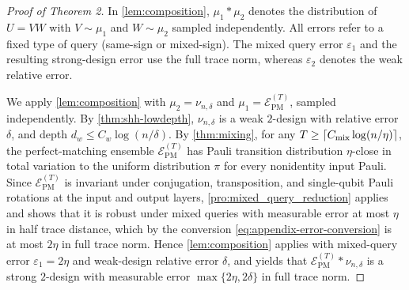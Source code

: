\documentclass[
    aps,
    superscriptaddress,
    onecolumn,
    10pt,
    prx,
    nofootinbib
]{revtex4-2}
\newcommand{\PM}{\mathrm{PM}}
\newcommand{\cE}{\mathcal E}
\theoremstyle{namedstatement}
\theoremstyle{plain}
\begin{document}
\begin{proof}[Proof of Theorem 2]
 In \cref{lem:composition}, $\mu_{1}*\mu_{2}$ denotes the distribution of $U=VW$ with
$V\sim\mu_{1}$ and $W\sim\mu_{2}$ sampled independently. All errors refer to a fixed type of query (same-sign or mixed-sign). The mixed query error $\varepsilon_1$ and the resulting strong-design error use the full trace norm, whereas $\varepsilon_2$ denotes the weak relative error.

We apply \cref{lem:composition} with $\mu_{2}=\nu_{n,\delta}$ and
$\mu_{1}=\cE_{\PM}^{(T)}$, sampled independently. By
\cref{thm:shh-lowdepth}, $\nu_{n,\delta}$ is a weak $2$-design with
relative error $\delta$, and depth $d_{w}\leq C_{w}\log(n/\delta)$.
By \cref{thm:mixing}, for any
$T\geq\lceil C_{\rm mix}\log(n/\eta)\rceil$, the perfect-matching
ensemble $\cE_{\PM}^{(T)}$ has Pauli transition distribution
$\eta$-close in total variation to the uniform distribution $\pi$ for
every nonidentity input Pauli. Since $\cE_{\PM}^{(T)}$ is invariant
under conjugation, transposition, and single-qubit Pauli rotations at
the input and output layers, \cref{pro:mixed_query_reduction} applies and
shows that it is robust under mixed queries with measurable error
at most $\eta$ in half trace distance, which by the conversion
\eqref{eq:appendix-error-conversion} is at most $2\eta$ in full
trace norm. Hence \cref{lem:composition} applies with mixed-query
error $\varepsilon_{1}=2\eta$ and weak-design relative error
$\delta$, and yields that $\cE_{\PM}^{(T)}*\nu_{n,\delta}$ is a
strong $2$-design with measurable error $\max\{2\eta,2\delta\}$ in
full trace norm.


\end{proof}
\end{document}
